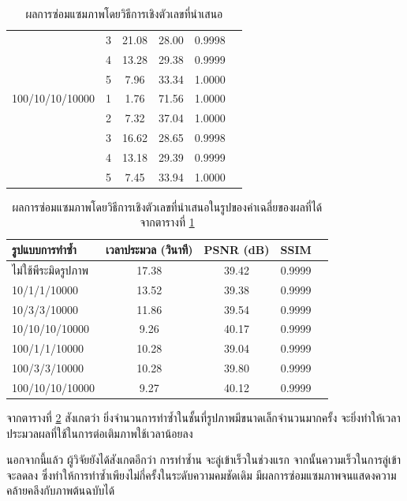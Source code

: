\begin{table}[H]
\begin{tabular}[ht]{|l|c|c|c|c|c|}
        & 3 & 21.08 & 28.00 & 0.9998 \\
        & 4 & 13.28 & 29.38 & 0.9999 \\
        & 5 & 7.96 & 33.34 & 1.0000\\
        \hline
        100/10/10/10000  & 1 & 1.76 & 71.56 & 1.0000 \\
        & 2 & 7.32 & 37.04 & 1.0000\\
        & 3 & 16.62 & 28.65 & 0.9998 \\
        & 4 & 13.18 & 29.39 & 0.9999\\
        & 5 & 7.45 & 33.94 & 1.0000 \\
        \hline
    \end{tabular}
    \caption{ผลการซ่อมแซมภาพโดยวิธีการเชิงตัวเลขที่นำเสนอ}
    \label{result:table-multiresolution1}
\end{table}	

\begin{table}[H]
    \centering
    \begin{tabular}[ht]{|l|c|c|c|c|}
        \hline
        รูปแบบการทำซ้ำ  & เวลาประมวล  (วินาที) & PSNR (dB) & SSIM \\
        \hline
        ไม่ใช้พีระมิดรูปภาพ & 17.38 & 39.42 & 0.9999 \\
        10/1/1/10000 & 13.52 & 39.38 & 0.9999 \\
        10/3/3/10000 & 11.86 & 39.54 & 0.9999 \\
        10/10/10/10000 & 9.26 & 40.17 & 0.9999\\
        100/1/1/10000 & 10.28 & 39.04 & 0.9999\\
        100/3/3/10000 & 10.28 & 39.80 & 0.9999\\
        100/10/10/10000 & 9.27 & 40.12 & 0.9999 \\
        \hline
    \end{tabular}
    \caption{ผลการซ่อมแซมภาพโดยวิธีการเชิงตัวเลขที่นำเสนอในรูปของค่าเฉลี่ยของผลที่ได้จากตารางที่ \ref{result:table-multiresolution1}}
    \label{result:table-multiresolution1-summary}
\end{table}	

\hspace{1cm}จากตารางที่ \ref{result:table-multiresolution1-summary} สังเกตว่า ยิ่งจำนวนการทำซ้ำในชั้นที่รูปภาพมีขนาดเล็กจำนวนมากครั้ง จะยิ่งทำให้เวลาประมวลผลที่ใช้ในการต่อเติมภาพใช้เวลาน้อยลง

\hspace{1cm} นอกจากนี้แล้ว ผู้วิจัยยังได้สังเกตอีกว่า การทำซ้ำน จะลู่เข้าเร็วในช่วงแรก จากนั้นความเร็วในการลู่เข้าจะลดลง ซึ่งทำให้การทำซ้ำเพียงไม่กี่ครั้งในระดับความคมชัดเดิม  มีผลการซ่อมแซมภาพจนแสดงความคล้ายคลึงกับภาพต้นฉบับได้


